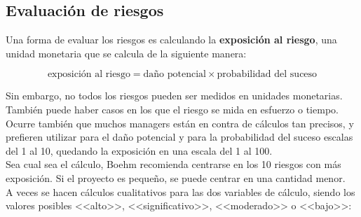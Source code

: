 \documentclass[12pt]{article}
\begin{document}
\subsection{Evaluación de riesgos}
\label{7.6.0}

{Una forma de evaluar los riesgos es calculando la \textbf{exposición al riesgo}, una unidad monetaria que se calcula de la siguiente manera:}

\begin{equation}
    \text{exposición al riesgo} = \text{daño potencial} \times \text{probabilidad del suceso}
\end{equation}

{Sin embargo, no todos los riesgos pueden ser medidos en unidades monetarias. También puede haber casos en los que el riesgo se mida en esfuerzo o tiempo. Ocurre también que muchos managers están en contra de cálculos tan precisos, y prefieren utilizar para el daño potencial y para la probabilidad del suceso escalas del 1 al 10, quedando la exposición en una escala del 1 al 100.} \\

{Sea cual sea el cálculo, Boehm recomienda centrarse en los 10 riesgos con más exposición. Si el proyecto es pequeño, se puede centrar en una cantidad menor.} \\

{A veces se hacen cálculos cualitativos para las dos variables de cálculo, siendo los valores posibles <<alto>>, <<significativo>>, <<moderado>> o <<bajo>>:}

\begin{table}[ht]
\centering
{}
\caption{Descriptores cualitativos}
\label{tab:7.1}
\end{table}
\end{document}
